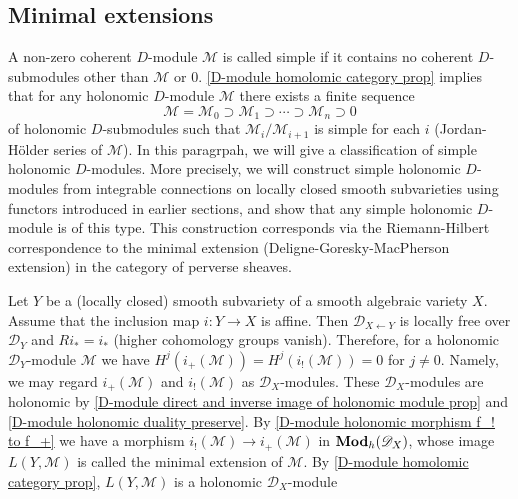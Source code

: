 \subsection{Minimal extensions}
A non-zero coherent $D$-module $\mathscr{M}$ is called simple if it contains no coherent $D$-submodules other than $\mathscr{M}$ or $0$. \cref{D-module homolomic category prop} implies that for any holonomic $D$-module $\mathscr{M}$ there exists a finite sequence
\[\mathscr{M}=\mathscr{M}_0\supset\mathscr{M}_1\supset\cdots\supset \mathscr{M}_n\supset 0\]
of holonomic $D$-submodules such that $\mathscr{M}_i/\mathscr{M}_{i+1}$ is simple for each $i$ (Jordan-H\"older series of $\mathscr{M}$). In this paragrpah, we will give a classification of simple holonomic $D$-modules. More precisely, we will construct simple holonomic $D$-modules from integrable connections on locally closed smooth subvarieties using functors introduced in earlier sections, and show that any simple holonomic $D$-module is of this type. This construction corresponds via the Riemann-Hilbert correspondence to the minimal extension (Deligne-Goresky-MacPherson extension) in the category of perverse sheaves.\par
Let $Y$ be a (locally closed) smooth subvariety of a smooth algebraic variety $X$. Assume that the inclusion map $i:Y\to X$ is affine. Then $\mathscr{D}_{X\leftarrow Y}$ is locally free over $\mathscr{D}_Y$ and $Ri_*=i_*$ (higher cohomology groups vanish). Therefore, for a holonomic $\mathscr{D}_Y$-module $\mathscr{M}$ we have $H^j(i_+(\mathscr{M}))=H^j(i_!(\mathscr{M}))=0$ for $j\neq 0$. Namely, we may regard $i_+(\mathscr{M})$ and $i_!(\mathscr{M})$ as $\mathscr{D}_X$-modules. These $\mathscr{D}_X$-modules are holonomic by \cref{D-module direct and inverse image of holonomic module prop} and \cref{D-module holonomic duality preserve}. By \cref{D-module holonomic morphism f_! to f_+} we have a morphism $i_!(\mathscr{M})\to i_+(\mathscr{M})$ in $\mathbf{Mod}_h(\mathscr{D}_X)$, whose image $L(Y,\mathscr{M})$ is called the minimal extension of $\mathscr{M}$. By \cref{D-module homolomic category prop}, $L(Y,\mathscr{M})$ is a holonomic $\mathscr{D}_X$-module

